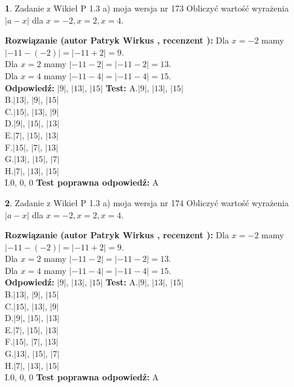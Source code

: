 \documentclass[12pt, a4paper]{article}
\theoremstyle{definition} %
\newtheorem{zad}{}
\newcommand{\zadStart}[1]{\begin{zad}#1\newline}
\newcommand{\zadStop}{\end{zad}}
\newcommand{\rozwStart}[2]{\noindent \textbf{Rozwiązanie (autor #1 , recenzent #2): }\newline}
\newcommand{\rozwStop}{\newline}
\newcommand{\odpStart}{\noindent \textbf{Odpowiedź:}\newline}
\newcommand{\odpStop}{\newline}
\newcommand{\testStart}{\noindent \textbf{Test:}\newline}
\newcommand{\testStop}{\newline}
\newcommand{\kluczStart}{\noindent \textbf{Test poprawna odpowiedź:}\newline}
\newcommand{\kluczStop}{\newline}
\begin{document}
\zadStart{Zadanie z Wikieł P 1.3 a) moja wersja nr 173}
Obliczyć wartość wyrażenia $|a - x|$ dla $x=-2,x=2,x=4$.
\zadStop
\rozwStart{Patryk Wirkus}{}
Dla $x = -2$ mamy $|-11 - (-2)| = |-11 + 2| = 9$.\\
Dla $x = 2$ mamy $|-11 - 2| = |-11 - 2| = 13$.\\
Dla $x = 4$ mamy $|-11 - 4| = |-11 - 4| = 15$.\\
\rozwStop
\odpStart
$|9|$, $|13|$, $|15|$
\odpStop
\testStart
A.$|9|$, $|13|$, $|15|$\\
B.$|13|$, $|9|$, $|15|$\\
C.$|15|$, $|13|$, $|9|$\\
D.$|9|$, $|15|$, $|13|$\\
E.$|7|$, $|15|$, $|13|$\\
F.$|15|$, $|7|$, $|13|$\\
G.$|13|$, $|15|$, $|7|$\\
H.$|7|$, $|13|$, $|15|$\\
I.$0$, $0$, $0$
\testStop
\kluczStart
A
\kluczStop



\zadStart{Zadanie z Wikieł P 1.3 a) moja wersja nr 174}
Obliczyć wartość wyrażenia $|a - x|$ dla $x=-2,x=2,x=4$.
\zadStop
\rozwStart{Patryk Wirkus}{}
Dla $x = -2$ mamy $|-11 - (-2)| = |-11 + 2| = 9$.\\
Dla $x = 2$ mamy $|-11 - 2| = |-11 - 2| = 13$.\\
Dla $x = 4$ mamy $|-11 - 4| = |-11 - 4| = 15$.\\
\rozwStop
\odpStart
$|9|$, $|13|$, $|15|$
\odpStop
\testStart
A.$|9|$, $|13|$, $|15|$\\
B.$|13|$, $|9|$, $|15|$\\
C.$|15|$, $|13|$, $|9|$\\
D.$|9|$, $|15|$, $|13|$\\
E.$|7|$, $|15|$, $|13|$\\
F.$|15|$, $|7|$, $|13|$\\
G.$|13|$, $|15|$, $|7|$\\
H.$|7|$, $|13|$, $|15|$\\
I.$0$, $0$, $0$
\testStop
\kluczStart
A
\kluczStop
\end{document}
